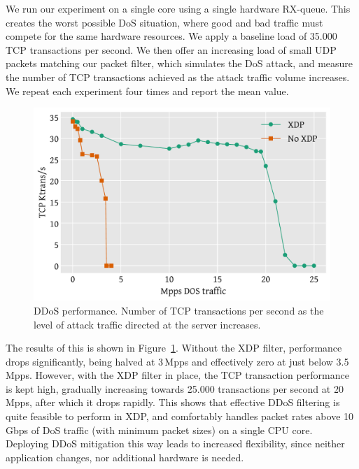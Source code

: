 \documentclass[10pt,sigconf,anonymous]{acmart}
\begin{document}
We run our experiment on a single core using a single hardware RX-queue.  This
creates the worst possible DoS situation, where good and bad traffic must
compete for the same hardware resources. We apply a baseline load of 35.000 TCP
transactions per second. We then offer an increasing load of small UDP packets
matching our packet filter, which simulates the DoS attack, and measure the
number of TCP transactions achieved as the attack traffic volume increases. We
repeat each experiment four times and report the mean value.

\begin{figure}[t]
\centering
\includegraphics[width=\linewidth]{figures/ddos-test.pdf}
\caption{\label{fig:ddos-results} DDoS performance. Number of TCP transactions
  per second as the level of attack traffic directed at the server increases.}
\end{figure}

The results of this is shown in Figure~\ref{fig:ddos-results}. Without the XDP
filter, performance drops significantly, being halved at 3\,Mpps and effectively
zero at just below 3.5\,Mpps. However, with the XDP filter in place, the TCP
transaction performance is kept high, gradually increasing towards 25.000
transactions per second at 20\,Mpps, after which it drops rapidly. This shows
that effective DDoS filtering is quite feasible to perform in XDP, and
comfortably handles packet rates above 10\,Gbps of DoS traffic (with minimum
packet sizes) on a single CPU core. Deploying DDoS mitigation this way leads to
increased flexibility, since neither application changes, nor additional
hardware is needed.
\end{document}
